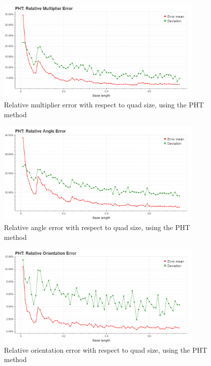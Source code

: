 \begin{figure}[ht]
	\centering
	\includegraphics[width=0.9\textwidth]{figures/plots/pht_relative_multiplier_error.png}
	\caption{Relative multiplier error with respect to quad size, using the PHT method}
	\label{fig:phtRelMulErr}
\end{figure}

\begin{figure}[ht]
	\centering
	\includegraphics[width=0.9\textwidth]{figures/plots/pht_relative_angle_error.png}
	\caption{Relative angle error with respect to quad size, using the PHT method}
	\label{fig:phtRelAngleErr}
\end{figure}

\begin{figure}[ht]
	\centering
	\includegraphics[width=0.9\textwidth]{figures/plots/pht_relative_orientation_error.png}
	\caption{Relative orientation error with respect to quad size, using the PHT method}
	\label{fig:phtRelOrientErr}
\end{figure}

